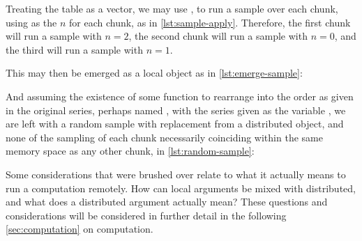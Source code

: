 
Treating the table as a vector, we may use , to run a sample over each chunk, using  as the \(n\) for each chunk, as in \cref{lst:sample-apply}.
Therefore, the first chunk will run a sample with \(n=2\), the second chunk will run a sample with \(n=0\), and the third will run a sample with \(n=1\).


This may then be emerged as a local object as in \cref{lst:emerge-sample}:


And assuming the existence of some function to rearrange into the order as given in the original series, perhaps named , with the series given as the variable , we are left with a random sample with replacement from a distributed object, and none of the sampling of each chunk necessarily coinciding within the same memory space as any other chunk, in \cref{lst:random-sample}:


Some considerations that were brushed over relate to what it actually means to run a computation remotely.
How can local arguments be mixed with distributed, and what does a distributed argument actually mean?
These questions and considerations will be considered in further detail in the following \cref{sec:computation} on computation.
